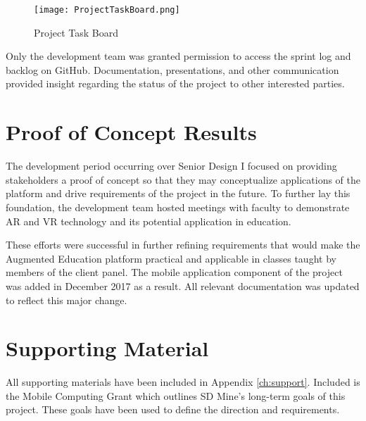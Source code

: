 \begin{figure}[H]
    \centering
    \texttt{[image: ProjectTaskBoard.png]}
    \caption{Project Task Board}
    \label{fig:ProjectTaskBoard}
\end{figure}

Only the development team was granted permission to access the sprint log and backlog on GitHub. Documentation, presentations, and other communication provided insight regarding the status of the project to other interested parties. 


\section{Proof of Concept Results}

The development period occurring over Senior Design I focused on providing stakeholders a proof of concept so that they may conceptualize applications of the platform and drive requirements of the project in the future. To further lay this foundation, the development team hosted meetings with faculty to demonstrate AR and VR technology and its potential application in education. 

These efforts were successful in further refining requirements that would make the Augmented Education platform practical and applicable in classes taught by members of the client panel. The mobile application component of the project was added in December 2017 as a result. All relevant documentation was updated to reflect this major change. 

\section{Supporting Material}

All supporting materials have been included in Appendix \ref{ch:support}. Included is the Mobile Computing Grant which outlines SD Mine's long-term goals of this project. These goals have been used to define the direction and requirements.
